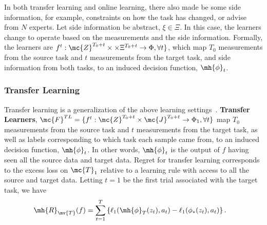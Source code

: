 \documentclass{article}
\begin{document}
In both transfer learning and online learning, there also made be some side information, for example, constraints on how the task has changed, or advise from $N$ experts. 
Let side information be abstract, $\xi \in \Xi$. In this case, the learners change to operate based on the measurements and the side information. Formally, the learners are $f^t: \mc{Z}^{T_0+t} \times  \times \Xi^{T_0+t} \to \Phi, \forall t\}$, which map $T_0$ measurements from the source task and $t$ measurements from the target task, and side information from both tasks,  to an induced decision function, $\mh{\phi}_t$.


\subsubsection{Transfer Learning}


Transfer learning is a generalization of the above learning settings~\cite{Pan2010-bv}. 
% 
 \textbf{Transfer Learners}, $\mc{F}^{TL}=\{ f^t: \mc{Z}^{T_0+t} \times \mc{J}^{T_0+t}  \to \Phi_1, \forall t\}$ map $T_0$ measurements from the source task and $t$ measurements from the target task, as well as labels corresponding to which task each sample came from, to an induced decision function, $\mh{\phi}_t$. 
 In other words, $\mh{\phi}_t$ is the output of $f$ having seen all the source data and target data. 
%
Regret for transfer learning corresponds to the excess loss on $\mc{T}_1$ relative to a learning rule with access to all the  source and target data. Letting $t=1$ be the first trial associated with the target task, we have
\begin{align}
    \mh{R}_{\mv{T}}(f) & =
    \sum_{t=1}^{T} \left\{ 
    \ell_1(\mh{\phi}_{T}(z_t), a_t)    -  
    \ell_1(\phi_*(z_t), a_t)  
    \right\}. 
\end{align}
\end{document}
